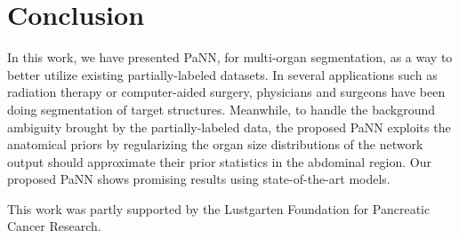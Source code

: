 \documentclass[10pt,twocolumn,letterpaper]{article}
\begin{document}
\section{Conclusion} \label{sec:con}
In this work, we have presented PaNN, for multi-organ segmentation, as a way to better utilize existing partially-labeled datasets. In several applications such as radiation therapy or computer-aided surgery, physicians and surgeons have been doing segmentation of target structures. Meanwhile, to handle the background ambiguity brought by the partially-labeled data, the proposed PaNN exploits the anatomical priors by regularizing the organ size distributions of the network output should approximate their prior statistics in the abdominal region. Our proposed PaNN shows promising results using state-of-the-art models. 

This work was partly supported by the Lustgarten Foundation for Pancreatic Cancer Research.


{\small


}


\clearpage
\onecolumn
\appendix
\end{document}
